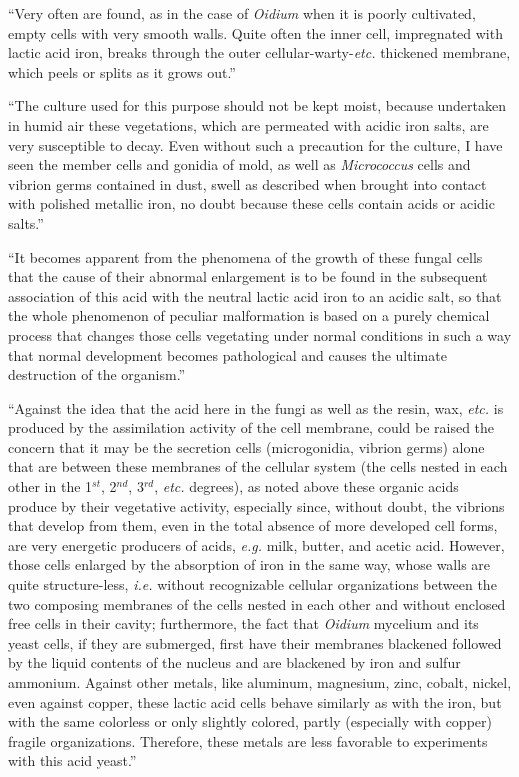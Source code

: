 \documentclass[a4paper, 12pt, oneside]{article}
\begin{document}
``Very often are found, as in the case of \emph{Oidium} when it is poorly cultivated, empty cells with very smooth walls. Quite often the inner cell, impregnated with lactic acid iron, breaks through the outer cellular-warty-\emph{etc.} thickened membrane, which peels or splits as it grows out.''

``The culture used for this purpose should not be kept moist, because undertaken in humid air these vegetations, which are permeated with acidic iron salts, are very susceptible to decay. Even without such a precaution for the culture, I have seen the member cells and gonidia of mold, as well as \emph{Micrococcus} cells and vibrion germs contained in dust, swell as described when brought into contact with polished metallic iron, no doubt because these cells contain acids or acidic salts.''

``It becomes apparent from the phenomena of the growth of these fungal cells that the cause of their abnormal enlargement is to be found in the subsequent association of this acid with the neutral lactic acid iron to an acidic salt, so that the whole phenomenon of peculiar malformation is based on a purely chemical process that changes those cells vegetating under normal conditions in such a way that normal development becomes pathological and causes the ultimate destruction of the organism.''

``Against the idea that the acid here in the fungi as well as the resin, wax, \emph{etc.} is produced by the assimilation activity of the cell membrane, could be raised the concern that it may be the secretion cells (microgonidia, vibrion germs) alone that are between these membranes of the cellular system (the cells nested in each other in the 1$^{st}$, 2$^{nd}$, 3$^{rd}$, \emph{etc.} degrees), as noted above these organic acids produce by their vegetative activity, especially since, without doubt, the vibrions that develop from them, even in the total absence of more developed cell forms, are very energetic producers of acids, \emph{e.g.} milk, butter, and acetic acid. However, those cells enlarged by the absorption of iron in the same way, whose walls are quite structure-less, \emph{i.e.} without recognizable cellular organizations between the two composing membranes of the cells nested in each other and without enclosed free cells in their cavity; furthermore, the fact that \emph{Oidium} mycelium and its yeast cells, if they are submerged, first have their membranes blackened followed by the liquid contents of the nucleus and are blackened by iron and sulfur ammonium. Against other metals, like aluminum, magnesium, zinc, cobalt, nickel, even against copper, these lactic acid cells behave similarly as with the iron, but with the same colorless or only slightly colored, partly (especially with copper) fragile organizations. Therefore, these metals are less favorable to experiments with this acid yeast.''
\end{document}
